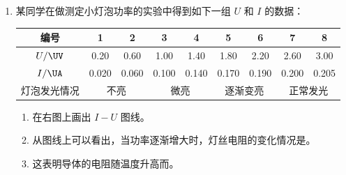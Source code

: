 \documentclass[\gkver]{gaokaozhenti}
\begin{document}
\begin{enumerate}
\item
某同学在做测定小灯泡功率的实验中得到如下一组 $U$ 和 $I$ 的数据：

\begin{center}
\begin{tabular}{|c|c|c|c|c|c|c|c|c|}
\hline
编号 & 1 & 2 & 3 & 4 & 5 & 6 & 7 & 8 \\ \hline
$U/\UV$ & 0.20 & 0.60 & 1.00 & 1.40 & 1.80 & 2.20 & 2.60 & 3.00 \\ \hline
$I/\UA$ & 0.020 & 0.060 & 0.100 & 0.140 & 0.170 & 0.190 & 0.200 & 0.205 \\ \hline
灯泡发光情况 & \multicolumn{2}{c|}{不亮} & \multicolumn{2}{c|}{微亮} & \multicolumn{2}{c|}{逐渐变亮} & \multicolumn{2}{c|}{正常发光} \\ \hline
\end{tabular}
\end{center}

\begin{enumerate}
	\item
	在右图上画出 $I-U$ 图线。
	\item
	从图线上可以看出，当功率逐渐增大时，灯丝电阻的变化情况是。
	\item
	这表明导体的电阻随温度升高而。
\end{enumerate}
\onepicture[align=right, w=7.60cm]{}


\end{enumerate}
\end{document}
